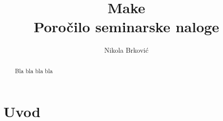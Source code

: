 \documentclass[notitlepage]{report}
\title{%
  Make \\
  \large Poročilo seminarske naloge
}
\author{Nikola Brković}
\begin{document}
\maketitle

\begin{abstract}
Bla bla bla bla
\end{abstract}

\section*{Uvod}
\end{document}
